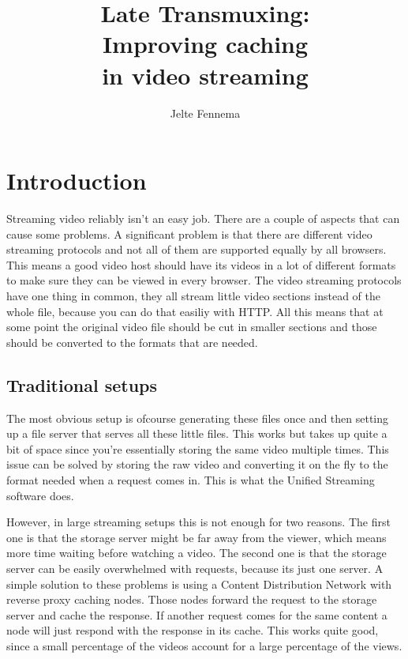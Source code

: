 \documentclass[twoside,openright]{uva-bachelor-thesis}
\title{Late Transmuxing:\\Improving caching \\in video streaming}
\author{Jelte Fennema}
\begin{document}
\maketitle

\begin{abstract}
\end{abstract}


\tableofcontents

\chapter{Introduction}
Streaming video reliably isn't an easy job. There are a couple of aspects that
can cause some problems. A significant problem is that there are different video
streaming protocols and not all of them are supported equally by all browsers.
This means a good video host should have its videos in a lot of different
formats to make sure they can be viewed in every browser. The video streaming
protocols have one thing in common, they all stream little video sections
instead of the whole file, because you can do that easiliy with
HTTP\autocite{http}. All this means that at some point the original video file
should be cut in smaller sections and those should be converted to the formats
that are needed.


\section{Traditional setups}
The most obvious setup is ofcourse generating these files once and then setting
up a file server that serves all these little files. This works but takes up
quite a bit of space since you're essentially storing the same video multiple
times. This issue can be solved by storing the raw video and converting it on
the fly to the format needed when a request comes in. This is what the Unified
Streaming software does.

However, in large streaming setups this is not enough for two reasons. The first
one is that the storage server might be far away from the viewer, which means
more time waiting before watching a video. The second one is that the storage
server can be easily overwhelmed with requests, because its just one server. A
simple solution to these problems is using a Content Distribution
Network\autocite{cdns} with reverse proxy caching\autocite{revproxy} nodes.
Those nodes forward the request to the storage server and cache the response. If
another request comes for the same content a node will just respond with the
response in its cache. This works quite good, since a small percentage of the
videos account for a large percentage of the views.
\end{document}
